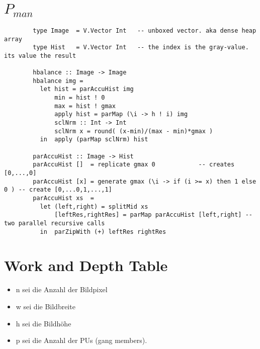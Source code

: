 \documentclass{article}
\newcommand{\man}[0]{$P_{man}$}
\begin{document}
    \section{ \man}
      \begin{lstlisting}
        type Image  = V.Vector Int   -- unboxed vector. aka dense heap array
        type Hist   = V.Vector Int   -- the index is the gray-value. its value the result

        hbalance :: Image -> Image
        hbalance img =
          let hist = parAccuHist img
              min = hist ! 0
              max = hist ! gmax
              apply hist = parMap (\i -> h ! i) img
              sclNrm :: Int -> Int
              sclNrm x = round( (x-min)/(max - min)*gmax )
          in  apply (parMap sclNrm) hist

        parAccuHist :: Image -> Hist
        parAccuHist []  = replicate gmax 0            -- creates [0,...,0]
        parAccuHist [x] = generate gmax (\i -> if (i >= x) then 1 else 0 ) -- create [0,...0,1,...,1]
        parAccuHist xs  =
          let (left,right) = splitMid xs
              [leftRes,rightRes] = parMap parAccuHist [left,right] -- two parallel recursive calls
          in  parZipWith (+) leftRes rightRes
      \end{lstlisting}
    
    \newpage
    
    \section{Work and Depth Table}
      
      \begin{itemize}
        \item n sei die Anzahl der Bildpixel
        \item w sei die Bildbreite
        \item h sei die Bildhöhe
        \item p sei die Anzahl der PUs (gang members).
      \end{itemize}
      
\end{document}
